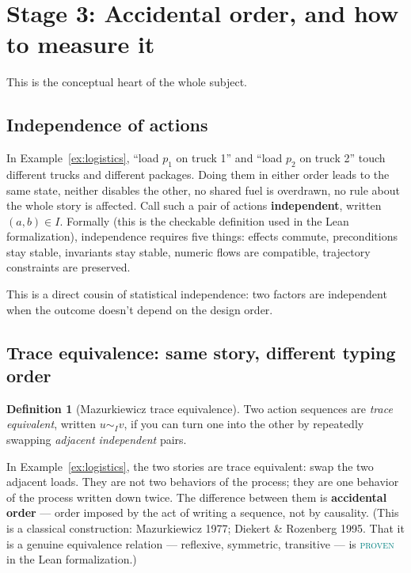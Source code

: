 \documentclass[11pt]{article}
\newcommand{\PROVEN}{\textcolor{teal}{\textsc{proven}}}
\theoremstyle{definition}
\newtheorem{definition}{Definition}[section]
\theoremstyle{plain}
\theoremstyle{remark}
\begin{document}
\section{Stage 3: Accidental order, and how to measure it}
\label{sec:traces}

This is the conceptual heart of the whole subject.

\subsection{Independence of actions}

In Example~\ref{ex:logistics}, ``load $p_1$ on truck 1'' and ``load $p_2$
on truck 2'' touch different trucks and different packages. Doing them in
either order leads to the same state, neither disables the other, no shared
fuel is overdrawn, no rule about the whole story is affected. Call such a
pair of actions \textbf{independent}, written $(a, b) \in I$. Formally
(this is the checkable definition used in the Lean formalization),
independence requires five things: effects commute, preconditions stay
stable, invariants stay stable, numeric flows are compatible, trajectory
constraints are preserved.

This is a direct cousin of statistical independence: two factors are
independent when the outcome doesn't depend on the design order.

\subsection{Trace equivalence: same story, different typing order}

\begin{definition}[Mazurkiewicz trace equivalence]
Two action sequences are \emph{trace equivalent}, written
$u \sim_I v$, if you can turn one into the other by repeatedly swapping
\emph{adjacent independent} pairs.
\end{definition}

In Example~\ref{ex:logistics}, the two stories are trace equivalent: swap
the two adjacent loads. They are not two behaviors of the process; they are
one behavior of the process written down twice. The difference between them
is \textbf{accidental order} --- order imposed by the act of writing a
sequence, not by causality. (This is a classical construction:
Mazurkiewicz 1977; Diekert \& Rozenberg 1995. That it is a genuine
equivalence relation --- reflexive, symmetric, transitive --- is \PROVEN{}
in the Lean formalization.)
\end{document}
